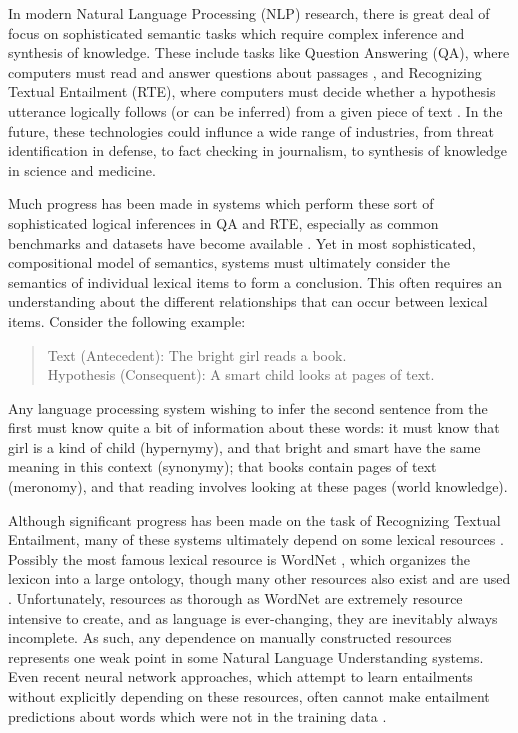 \documentclass[12pt]{article}
\begin{document}
In modern Natural Language Processing (NLP) research, there is great deal of
focus on sophisticated semantic tasks which require complex inference and
synthesis of knowledge. These include tasks like Question Answering (QA), where
computers must read and answer questions about passages
\cite{hermann:2015:nips,weston:2016:iclr}, and Recognizing Textual Entailment
(RTE), where computers must decide whether a hypothesis utterance logically
follows (or can be inferred) from a given piece of text
\cite{dagan:2006:mlc,marelli:2014:semeval,bowman:2015:emnlp}. In the future,
these technologies could influnce a wide range of industries, from threat
identification in defense, to fact checking in journalism, to
synthesis of knowledge in science and medicine.

Much progress has been made in systems which perform these sort of
sophisticated logical inferences in QA and RTE, especially as common benchmarks
and datasets have become available
\cite{dagan:2006:mlc,giampiccolo:2007:pascal,bentivogli:2009:tac,marelli:2014:semeval,bowman:2015:emnlp}.
Yet in most sophisticated, compositional model of semantics, systems must
ultimately consider the semantics of individual lexical items to form a
conclusion. This often requires an understanding about the different
relationships that can occur between lexical items. Consider the following
example:
\begin{quote}
  Text (Antecedent): The bright girl reads a book.\\
  Hypothesis (Consequent): A smart child looks at pages of text.
\end{quote}
Any language processing system wishing to infer the second sentence from the
first must know quite a bit of information about these words: it must know that
girl is a kind of child (hypernymy), and that bright and smart have the same
meaning in this context (synonymy); that books contain pages of text
(meronomy), and that reading involves looking at these pages (world knowledge).

Although significant progress has been made on the task of Recognizing Textual
Entailment, many of these systems ultimately depend on some lexical resources
\cite{beltagy:2014:semeval,bjerva:2014:semeval,lai:2014:semeval,marelli:2014:semeval,beltagy:2016:cl}.
Possibly the most famous lexical resource is WordNet \cite{miller:1995:acm},
which organizes the lexicon into a large ontology,
though many other resources also exist and are used
\cite{baker:1998:acl,baroni:2011:gems,baroni:2012:eacl,ganitkevitch:2013:naacl,jurgens:2012:semeval,levy:2014:conll,turney:2015:nle}.
Unfortunately, resources as thorough as WordNet are extremely resource
intensive to create, and as language is ever-changing, they are inevitably
always incomplete. As such, any dependence on manually constructed resources
represents one weak point in some Natural Language Understanding systems. Even
recent neural network approaches, which attempt to learn entailments without
explicitly depending on these resources, often cannot make entailment
predictions about words which were not in the training data
\cite{bowman:2015:emnlp,cheng:2016:arxiv}.
\end{document}
